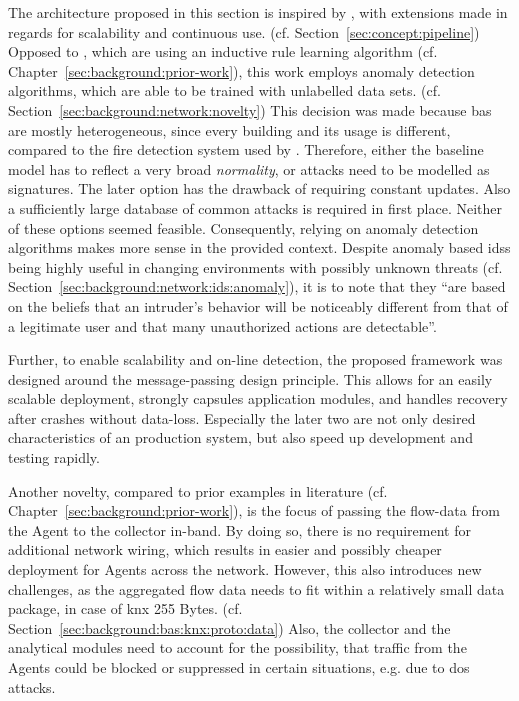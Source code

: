 The architecture proposed in this section is inspired by \textcite{Pan2014}, with extensions made in regards for scalability and continuous use. (cf. Section~\ref{sec:concept:pipeline})
Opposed to \textcite{Pan2014}, which are using an inductive rule learning algorithm (cf. Chapter~\ref{sec:background:prior-work}), this work employs anomaly detection algorithms, which are able to be trained with unlabelled data sets. (cf. Section~\ref{sec:background:network:novelty})
This decision was made because \gls{bas} are mostly heterogeneous, since every building and its usage is different, compared to the fire detection system used by \textcite{Pan2014}.
Therefore, either the baseline model has to reflect a very broad \emph{normality}, or attacks need to be modelled as signatures. The later option has the drawback of requiring constant updates. Also a sufficiently large database of common attacks is required in first place.
Neither of these options seemed feasible.
Consequently, relying on anomaly detection algorithms makes more sense in the provided context.
Despite anomaly based \glspl{ids} being highly useful in changing environments with possibly unknown threats (cf. Section~\ref{sec:background:network:ids:anomaly}), it is to note that they \enquote{are based on the beliefs that an intruder's behavior will be noticeably different from that of a legitimate user and that many unauthorized actions are detectable}. \parencite{Mukherjee1994,Yang2006}

Further, to enable scalability and on-line detection, the proposed framework was designed around the message-passing design principle.
This allows for an easily scalable deployment, strongly capsules application modules, and handles recovery after crashes without data-loss.
Especially the later two are not only desired characteristics of an production system, but also speed up development and testing rapidly.

Another novelty, compared to prior examples in literature (cf. Chapter~\ref{sec:background:prior-work}), is the focus of passing the flow-data from the Agent to the collector in-band. By doing so, there is no requirement for additional network wiring, which results in easier and possibly cheaper deployment for Agents across the network.
However, this also introduces new challenges, as the aggregated flow data needs to fit within a relatively small data package, in case of \gls{knx} 255 Bytes. (cf. Section~\ref{sec:background:bas:knx:proto:data})
Also, the collector and the analytical modules need to account for the possibility, that traffic from the Agents could be blocked or suppressed in certain situations, e.g. due to \gls{dos} attacks.

